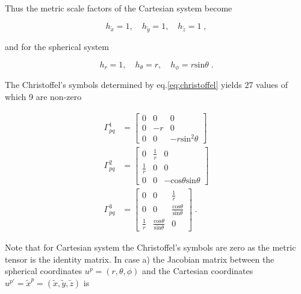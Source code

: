 \documentclass[extra,mreferee]{gji}
\begin{document}
 Thus the metric scale factors of the Cartesian system become 

\begin{equation}
h_{\tilde{x}} = 1, \quad h_{\tilde{y}} = 1, \quad h_{\tilde{z}} = 1 \; , \label{eq:scale_cartesian}
\end{equation}

and for the spherical system

\begin{equation}
h_r = 1, \quad h_{\theta} = r, \quad h_{\phi} = r \mathrm{sin}\theta  \; .\label{eq:scale_spherical}
\end{equation}

The Christoffel's symbols  determined by eq.\eqref{eq:christoffel} yields 27 values of which 9 are non-zero

\begin{align}
\Gamma_{pq}^1 & = 
\left[
\begin{array}{ccc}
0  & 0  & 0 \\
0  & -r & 0 \\ 
0  & 0  & -r\mathrm{sin}^2\theta 
\end{array}
\right]   \nonumber \\
\Gamma_{pq}^2 & =
\left[
\begin{array}{ccc}
0            & \frac{1}{r}  & 0 \\
\frac{1}{r}  & 0            & 0 \\ 
0            & 0            & -\mathrm{cos}\theta\mathrm{sin}\theta 
\end{array}
\right]   \nonumber \\
\Gamma_{pq}^3 & =
\left[
\begin{array}{ccc}
0            & 0                                              & \frac{1}{r} \\
0            & 0                                              & \frac{\mathrm{cos}\theta}{\mathrm{sin}\theta} \\ 
\frac{1}{r}  & \frac{\mathrm{cos}\theta}{\mathrm{sin}\theta}  & 0 
\end{array}
\right]   \;  .   \label{eq:christoffel_spherical}
\end{align}

Note that for  Cartesian system the Christoffel's symbols are zero as the metric tensor is the identity matrix. In case a) the Jacobian matrix between the spherical coordinates $u^p=(r,\theta,\phi)$ and the Cartesian coordinates $u^{p'}=\tilde{x}^p=(\tilde{x},\tilde{y},\tilde{z})$ is 
\end{document}
